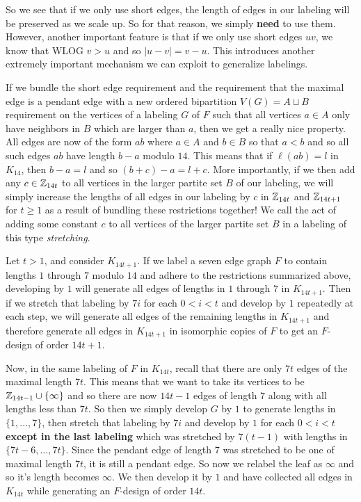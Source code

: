   So we see that if we only use short edges, the length of edges in our labeling will be preserved as we scale up. So for that reason, we simply \textbf{need} to use them. However, another important feature is that if we only use short edges $uv$, we know that WLOG $v>u$ and so $|u-v|=v-u$. This introduces another extremely important mechanism we can exploit to generalize labelings.

  If we bundle the short edge requirement and the requirement that the maximal edge is a pendant edge with a new ordered bipartition $V(G)=A\sqcup B$ requirement on the vertices of a labeling $G$ of $F$ such that all vertices $a\in A$ only have neighbors in $B$ which are larger than $a$, then we get a really nice property. All edges are now of the form $ab$ where $a\in A$ and $b\in B$ so that $a<b$ and so all such edges $ab$ have length $b-a$ modulo $14$. This means that if $\ell(ab)=l$ in $K_{14}$, then $b-a=l$ and so $(b+c)-a=l+c$. More importantly, if we then add any $c\in \mathbb{Z}_{14t}$ to all vertices in the larger partite set $B$ of our labeling, we will simply increase the lengths of all edges in our labeling by $c$ in $\mathbb{Z}_{14t}$ and $\mathbb{Z}_{14t+1}$ for $t\geq 1$ as a result of bundling these restrictions together! We call the act of adding some constant $c$ to all vertices of the larger partite set $B$ in a labeling of this type \textit{stretching}.

  Let $t>1$, and consider $K_{14t+1}$. If we label a seven edge graph $F$ to contain lengths $1$ through $7$ modulo $14$ and adhere to the restrictions summarized above, developing by $1$ will generate all edges of lengths in $1$ through $7$ in $K_{14t+1}$. Then if we stretch that labeling by $7i$ for each $0<i<t$ and develop by $1$ repeatedly at each step, we will generate all edges of the remaining lengths in $K_{14t+1}$ and therefore generate all edges in $K_{14t+1}$ in isomorphic copies of $F$ to get an $F$-design of order $14t+1$. 
  
  Now, in the same labeling of $F$ in $K_{14t}$, recall that there are only $7t$ edges of the maximal length $7t$. This means that we want to take its vertices to be $\mathbb{Z}_{14t-1}\cup \{\infty\}$ and so there are now $14t-1$ edges of length $7$ along with all lengths less than $7t$. So then we simply develop $G$ by $1$ to generate lengths in $\{1,\hdots,7\}$, then stretch that labeling by $7i$ and develop by $1$ for each $0<i<t$ \textbf{except in the last labeling} which was stretched by $7(t-1)$ with lengths in $\{7t-6,\hdots,7t\}$. Since the pendant edge of length $7$ was stretched to be one of maximal length $7t$, it is still a pendant edge. So now we relabel the leaf as $\infty$ and so it's length becomes $\infty$. We then develop it by $1$ and have collected all edges in $K_{14t}$ while generating an $F$-design of order $14t$.

